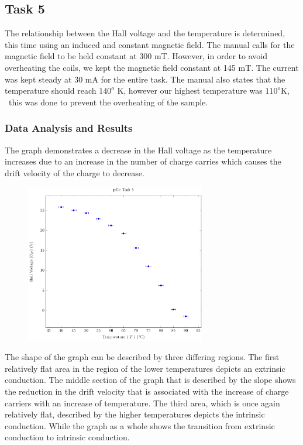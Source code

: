 \documentclass[a4paper]{article}
\begin{document}
\subsection{Task 5}

\qq The relationship between the Hall voltage and the temperature is
determined, this time using an induced and constant magnetic
field. The manual calls for the magnetic field to be held constant at
300 mT. However, in order to avoid overheating the coils, we kept the
magnetic field constant at 145 mT. The current was kept steady at 30
mA for the entire task. The manual also states that the temperature
should reach $140^o$ K, however our highest temperature was $110^o$K, \
this was done to prevent the overheating of the sample.


\subsubsection{Data Analysis and Results}
\qq The graph demonstrates a decrease in the Hall voltage as the
temperature increases due to an increase in the number of charge
carries which causes the drift velocity of the charge to decrease.

\begin{figure}[H]
\centering
\includegraphics[width=0.7\textwidth]{PGePlots/Task5/pGeTask5.pdf}
\label{task25plot}
\end{figure}

\qq The shape of the graph can be described by three differing
regions. The first relatively flat area in the region of the lower
temperatures depicts an extrinsic conduction. The middle section of
the graph that is described by the slope shows the reduction in the
drift velocity that is associated with the increase of charge carriers
with an increase of temperature. The third area, which is once again
relatively flat, described by the higher temperatures depicts the
intrinsic conduction. While the graph as a whole shows the transition
from extrinsic conduction to intrinsic conduction.
\end{document}
